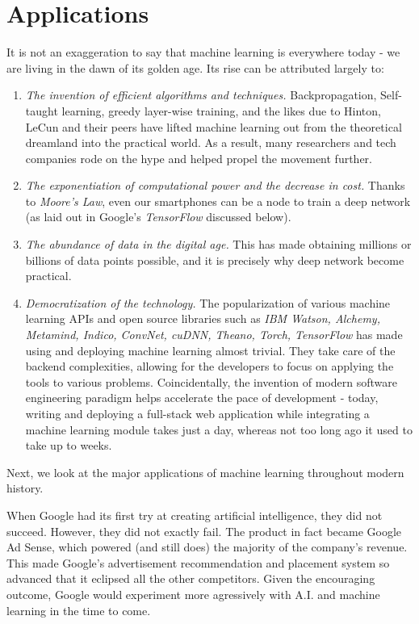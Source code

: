 \documentclass[12pt]{article}  %
\begin{document}
\section{Applications}
It is not an exaggeration to say that machine learning is everywhere today - we are living in the dawn of its golden age. Its rise can be attributed largely to:

\begin{enumerate}
	\item \emph{The invention of efficient algorithms and techniques.} Backpropagation, Self-taught learning, greedy layer-wise training, and the likes due to Hinton, LeCun and their peers have lifted machine learning out from the theoretical dreamland into the practical world. As a result, many researchers and tech companies rode on the hype and helped propel the movement further.
	\item \emph{The exponentiation of computational power and the decrease in cost.} Thanks to \emph{Moore's Law}, even our smartphones can be a node to train a deep network (as laid out in Google's \emph{TensorFlow} discussed below).
	\item \emph{The abundance of data in the digital age.} This has made obtaining millions or billions of data points possible, and it is precisely why deep network become practical.
	\item \emph{Democratization of the technology.} The popularization of various machine learning APIs and open source libraries such as \emph{IBM Watson, Alchemy, Metamind, Indico, ConvNet, cuDNN, Theano, Torch, TensorFlow} has made using and deploying machine learning almost trivial. They take care of the backend complexities, allowing for the developers to focus on applying the tools to various problems. Coincidentally, the invention of modern software engineering paradigm helps accelerate the pace of development - today, writing and deploying a full-stack web application while integrating a machine learning module takes just a day, whereas not too long ago it used to take up to weeks.
\end{enumerate}


Next, we look at the major applications of machine learning throughout modern history.

When Google had its first try at creating artificial intelligence, they did not succeed. However, they did not exactly fail. The product in fact became Google Ad Sense, which powered (and still does) the majority of the company's revenue. This made Google's advertisement recommendation and placement system so advanced that it eclipsed all the other competitors. Given the encouraging outcome, Google would experiment more agressively with A.I. and machine learning in the time to come.
\end{document}
